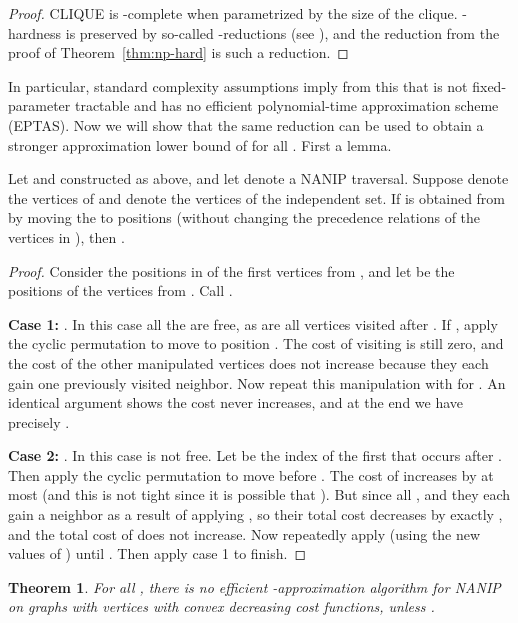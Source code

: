 \documentclass[english]{llncs}
\newtheorem{thm}{Theorem}
\begin{document}
\begin{proof} 

CLIQUE is -complete when parametrized by the size of the clique.
-hardness is preserved by so-called -reductions (see
\cite{DowneyF13}), and the reduction from the proof of
Theorem~\ref{thm:np-hard} is such a reduction. 

\end{proof}

In particular, standard complexity assumptions imply from this that
 is not fixed-parameter tractable and has no efficient
polynomial-time approximation scheme (EPTAS). Now we will show that the same
reduction can be used to obtain a stronger approximation lower bound of  for all . First a lemma.

\begin{lemma}
Let  and  constructed as above, and let  denote a NANIP
traversal.  Suppose  denote the vertices of  and  denote the vertices
of the independent set.  If  is obtained from  by moving the
 to positions  (without changing the precedence relations of the vertices
in ), then .
\end{lemma}


\begin{proof}
Consider the positions in  of the first  vertices from , and let
 be the positions of the vertices from . Call .

\textbf{Case 1:} . In this case all the  are free, as are all
vertices visited after . If , apply the cyclic permutation
 to move  to position . The cost
of visiting  is still zero, and the cost of the other manipulated vertices
does not increase because they each gain one previously visited neighbor. Now
repeat this manipulation with  for . An identical argument shows the cost never increases, and at the end
we have precisely . 

\textbf{Case 2:} . In this case  is not free. Let  be the
index of the first  that occurs after . Then apply the
cyclic permutation  to move  before .
The cost of  increases by at most  (and this is not tight since it
is possible that ). But since all , and they each gain a neighbor as a result of applying
, so their total cost decreases by exactly , and the total cost
of  does not increase. Now repeatedly apply  (using the new values
of ) until . Then apply case 1 to finish.

\end{proof}


\begin{thm}
For all , there is no efficient -approximation
algorithm for NANIP on graphs with  vertices with convex decreasing cost
functions, unless .  
\end{thm}
\end{document}
